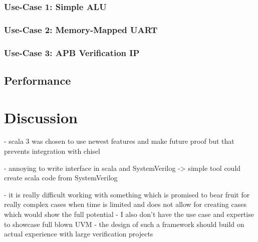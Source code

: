\documentclass[11pt,a4paper]{report}
\begin{document}
\subsection{Use-Case 1: Simple ALU} %

\subsection{Use-Case 2: Memory-Mapped UART} %

\subsection{Use-Case 3: APB Verification IP} %

\section{Performance} %

\chapter{Discussion} %

- scala 3 was chosen to use newest features and make future proof but that prevents integration with chisel

- annoying to write interface in scala and SystemVerilog -> simple tool could create scala code from SystemVerilog

- it is really difficult working with something which is promised to bear fruit for really complex cases when time is
limited and does not allow for creating cases which would show the full potential
- I also don't have the use case and expertise to showcase full blown UVM
- the design of such a framework should build on actual experience with large verification projects

\end{document}
